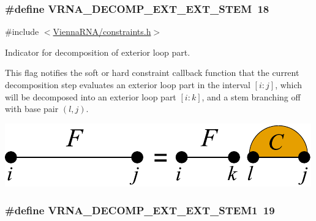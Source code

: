 \subsubsection[{\texorpdfstring{V\+R\+N\+A\+\_\+\+D\+E\+C\+O\+M\+P\+\_\+\+E\+X\+T\+\_\+\+E\+X\+T\+\_\+\+S\+T\+EM}{VRNA_DECOMP_EXT_EXT_STEM}}]{\setlength{\rightskip}{0pt plus 5cm}\#define V\+R\+N\+A\+\_\+\+D\+E\+C\+O\+M\+P\+\_\+\+E\+X\+T\+\_\+\+E\+X\+T\+\_\+\+S\+T\+EM~18}\hypertarget{group__constraints_ga06efd054c9271438f6d82d4559d9e69f}{}\label{group__constraints_ga06efd054c9271438f6d82d4559d9e69f}


{\ttfamily \#include $<$\hyperlink{constraints_8h}{Vienna\+R\+N\+A/constraints.\+h}$>$}



Indicator for decomposition of exterior loop part. 

This flag notifies the soft or hard constraint callback function that the current decomposition step evaluates an exterior loop part in the interval $[i:j]$, which will be decomposed into an exterior loop part $[i:k]$, and a stem branching off with base pair $(l,j)$.

 
\begin{DoxyImageNoCaption}
  \mbox{\includegraphics[width=\textwidth,height=\textheight/2,keepaspectratio=true]{decomp_ext_ext_stem}}
\end{DoxyImageNoCaption}
\subsubsection[{\texorpdfstring{V\+R\+N\+A\+\_\+\+D\+E\+C\+O\+M\+P\+\_\+\+E\+X\+T\+\_\+\+E\+X\+T\+\_\+\+S\+T\+E\+M1}{VRNA_DECOMP_EXT_EXT_STEM1}}]{\setlength{\rightskip}{0pt plus 5cm}\#define V\+R\+N\+A\+\_\+\+D\+E\+C\+O\+M\+P\+\_\+\+E\+X\+T\+\_\+\+E\+X\+T\+\_\+\+S\+T\+E\+M1~19}\hypertarget{group__constraints_ga2e75d7a77118735b32f25422d9686719}{}\label{group__constraints_ga2e75d7a77118735b32f25422d9686719}


